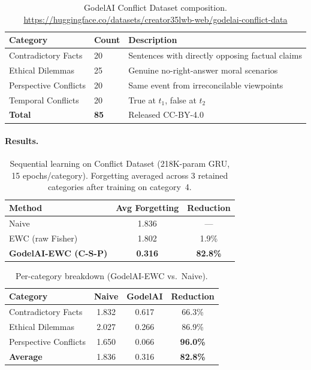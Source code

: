 \documentclass[12pt]{article}
\begin{document}
\begin{table}[ht]
\centering
\caption{GodelAI Conflict Dataset composition.
  \url{https://huggingface.co/datasets/creator35lwb-web/godelai-conflict-data}}
\label{tab:conflict-data}
\begin{tabular}{llp{6cm}}
\toprule
\textbf{Category} & \textbf{Count} & \textbf{Description} \\
\midrule
Contradictory Facts    & 20 & Sentences with directly opposing factual claims \\
Ethical Dilemmas       & 25 & Genuine no-right-answer moral scenarios \\
Perspective Conflicts  & 20 & Same event from irreconcilable viewpoints \\
Temporal Conflicts     & 20 & True at $t_1$, false at $t_2$ \\
\midrule
\textbf{Total}         & \textbf{85} & Released CC-BY-4.0 \\
\bottomrule
\end{tabular}
\end{table}

\paragraph{Results.}
\begin{table}[ht]
\centering
\caption{Sequential learning on Conflict Dataset (218K-param GRU, 15 epochs/category).
  Forgetting averaged across 3 retained categories after training on category~4.}
\label{tab:conflict-results}
\begin{tabular}{lcc}
\toprule
\textbf{Method} & \textbf{Avg Forgetting} & \textbf{Reduction} \\
\midrule
Naive                        & 1.836 & --- \\
EWC (raw Fisher)             & 1.802 & 1.9\% \\
\textbf{GodelAI-EWC (C-S-P)} & \textbf{0.316} & \textbf{82.8\%} \\
\bottomrule
\end{tabular}
\end{table}

\begin{table}[ht]
\centering
\caption{Per-category breakdown (GodelAI-EWC vs.\ Naive).}
\label{tab:conflict-percat}
\begin{tabular}{lccc}
\toprule
\textbf{Category} & \textbf{Naive} & \textbf{GodelAI} & \textbf{Reduction} \\
\midrule
Contradictory Facts   & 1.832 & 0.617 & 66.3\% \\
Ethical Dilemmas      & 2.027 & 0.266 & 86.9\% \\
Perspective Conflicts & 1.650 & 0.066 & \textbf{96.0\%} \\
\midrule
\textbf{Average}      & 1.836 & 0.316 & \textbf{82.8\%} \\
\bottomrule
\end{tabular}
\end{table}
\end{document}
